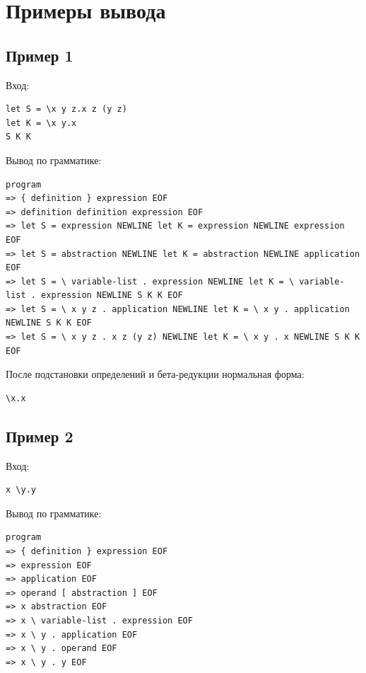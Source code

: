 \documentclass[12pt,a4paper]{article}
\begin{document}
\section*{Примеры вывода}

\subsection*{Пример 1}

Вход:

\begin{lstlisting}[style=grammar]
let S = \x y z.x z (y z)
let K = \x y.x
S K K
\end{lstlisting}

Вывод по грамматике:

\begin{lstlisting}[style=grammar]
program
=> { definition } expression EOF
=> definition definition expression EOF
=> let S = expression NEWLINE let K = expression NEWLINE expression EOF
=> let S = abstraction NEWLINE let K = abstraction NEWLINE application EOF
=> let S = \ variable-list . expression NEWLINE let K = \ variable-list . expression NEWLINE S K K EOF
=> let S = \ x y z . application NEWLINE let K = \ x y . application NEWLINE S K K EOF
=> let S = \ x y z . x z (y z) NEWLINE let K = \ x y . x NEWLINE S K K EOF
\end{lstlisting}

После подстановки определений и бета-редукции нормальная форма:

\begin{lstlisting}[style=grammar]
\x.x
\end{lstlisting}

\subsection*{Пример 2}

Вход:

\begin{lstlisting}[style=grammar]
x \y.y
\end{lstlisting}

Вывод по грамматике:

\begin{lstlisting}[style=grammar]
program
=> { definition } expression EOF
=> expression EOF
=> application EOF
=> operand [ abstraction ] EOF
=> x abstraction EOF
=> x \ variable-list . expression EOF
=> x \ y . application EOF
=> x \ y . operand EOF
=> x \ y . y EOF
\end{lstlisting}
\end{document}
